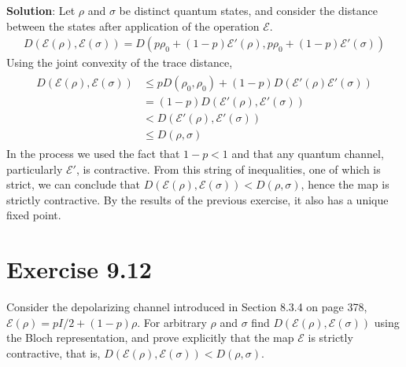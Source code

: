 \documentclass{book}
\newcommand{\mc}[1]{\mathcal{#1}}
\begin{document}
    \textbf{Solution}: Let $\rho$ and $\sigma$ be distinct quantum states, and consider the distance between the states after application of the operation $\mc{E}$.
    \begin{align}
        D(\mc{E}(\rho),\mc{E}(\sigma)) = D(p\rho_0 + (1-p)\mc{E}'(\rho), p \rho_0 + (1-p)\mc{E}'(\sigma))
    \end{align}
    Using the joint convexity of the trace distance,
    \begin{align}
    \begin{aligned}
        D(\mc{E}(\rho),\mc{E}(\sigma)) &\leq p D(\rho_0, \rho_0) + (1-p)D(\mc{E}'(\rho) \mc{E}'(\sigma)) \\
        &= (1-p) D(\mc{E}'(\rho), \mc{E}'(\sigma)) \\
        &< D(\mc{E}'(\rho), \mc{E}'(\sigma))\\
        &\leq D(\rho, \sigma)
    \end{aligned}
    \end{align}
    In the process we used the fact that $1-p <1$ and that any quantum channel, particularly $\mc{E}'$, is contractive. From this string of inequalities, one of which is strict, we can conclude that $D(\mc{E}(\rho), \mc{E}(\sigma)) < D(\rho, \sigma)$, hence the map is strictly contractive. By the results of the previous exercise, it also has a unique fixed point. 
    
\section*{Exercise 9.12}
    Consider the depolarizing channel introduced in Section 8.3.4 on page 378, $\mc{E}(\rho) = pI/2 + (1 - p)\rho$. For arbitrary $\rho$ and $\sigma$ find $D(\mc{E}(\rho), \mc{E}(\sigma))$ using the Bloch representation, and prove explicitly that the map $\mc{E}$ is strictly contractive, that is, $D(\mc{E}(\rho), \mc{E}(\sigma)) < D(\rho, \sigma)$.
    
\end{document}
